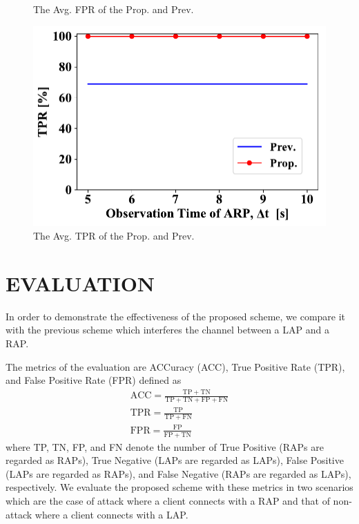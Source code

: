 \documentclass[conference]{IEEEtran}
\begin{document}
\begin{figure}[ht]
\begin{minipage}{0.33\hsize}
\begin{center}
        \end{center}
        \caption{The Avg. FPR of the Prop. and Prev.}
        \label{fig:fpr}
    \end{minipage}
    \begin{minipage}{0.33\hsize}
        \begin{center}
            \includegraphics[scale=0.34]{figure/TPR.pdf}
        \end{center}
        \caption{The Avg. TPR of the Prop. and Prev.}
        \label{fig:tpr}
    \end{minipage}
\vspace{-1zh}
\end{figure}
\section{EVALUATION}\label{sec:5}
In order to demonstrate the effectiveness of the proposed scheme, we compare it with the previous scheme \cite{previous} which interferes the channel between a LAP and a RAP.

The metrics of the evaluation are ACCuracy (ACC), True Positive Rate (TPR), and False Positive Rate (FPR) defined as
\begin{gather}
    \mathrm{ACC} = \frac{\mathrm{TP} + \mathrm{TN}}{\mathrm{TP} + \mathrm{TN} + \mathrm{FP} + \mathrm{FN}}\\
    \mathrm{TPR} = \frac{\mathrm{TP}}{\mathrm{TP} + \mathrm{FN}}\\
    \mathrm{FPR} = \frac{\mathrm{FP}}{\mathrm{FP} + \mathrm{TN}}
\end{gather}
where TP, TN, FP, and FN denote the number of True Positive (RAPs are regarded as RAPs), True Negative (LAPs are regarded as LAPs), False Positive (LAPs are regarded as RAPs), and False Negative (RAPs are regarded as LAPs), respectively.
We evaluate the proposed scheme with these metrics in two scenarios which are the case of attack where a client connects with a RAP and that of non-attack where a client connects with a LAP.
\end{document}

